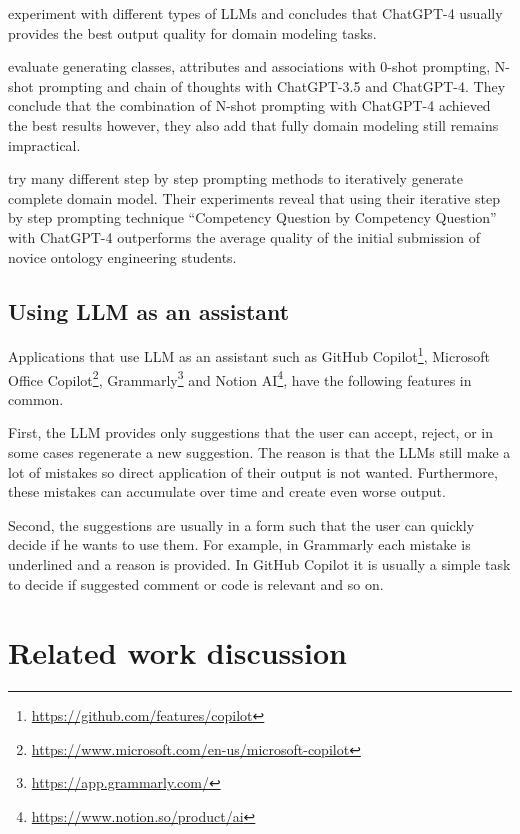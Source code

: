 \citet{BabaeiGiglou2023} experiment with different types of LLMs and concludes that ChatGPT-4 usually provides the best output quality for domain modeling tasks.

\citet{Chen2023} evaluate generating classes, attributes and associations with 0-shot prompting, N-shot prompting and chain of thoughts with ChatGPT-3.5 and ChatGPT-4. They conclude that the combination of N-shot prompting with ChatGPT-4 achieved the best results however, they also add that fully domain modeling still remains impractical.

\citet{Saeedizade2024} try many different step by step prompting methods to iteratively generate complete domain model. Their experiments reveal that using their iterative step by step prompting technique ``Competency Question by Competency Question'' with ChatGPT-4 outperforms the average quality of the initial submission of novice ontology engineering students. 


\section{Using LLM as an assistant}
\label{section:llm_as_an_assistant}

Applications that use LLM as an assistant such as GitHub Copilot\footnote{\url{https://github.com/features/copilot}}, Microsoft Office Copilot\footnote{\url{https://www.microsoft.com/en-us/microsoft-copilot}}, Grammarly\footnote{\url{https://app.grammarly.com/}} and Notion AI\footnote{\url{https://www.notion.so/product/ai}}, have the following features in common.

First, the LLM provides only suggestions that the user can accept, reject, or in some cases regenerate a new suggestion. The reason is that the LLMs still make a lot of mistakes so direct application of their output is not wanted. Furthermore, these mistakes can accumulate over time and create even worse output.

Second, the suggestions are usually in a form such that the user can quickly decide if he wants to use them. For example, in Grammarly each mistake is underlined and a reason is provided. In GitHub Copilot it is usually a simple task to decide if suggested comment or code is relevant and so on.


\chapter{Related work discussion}


